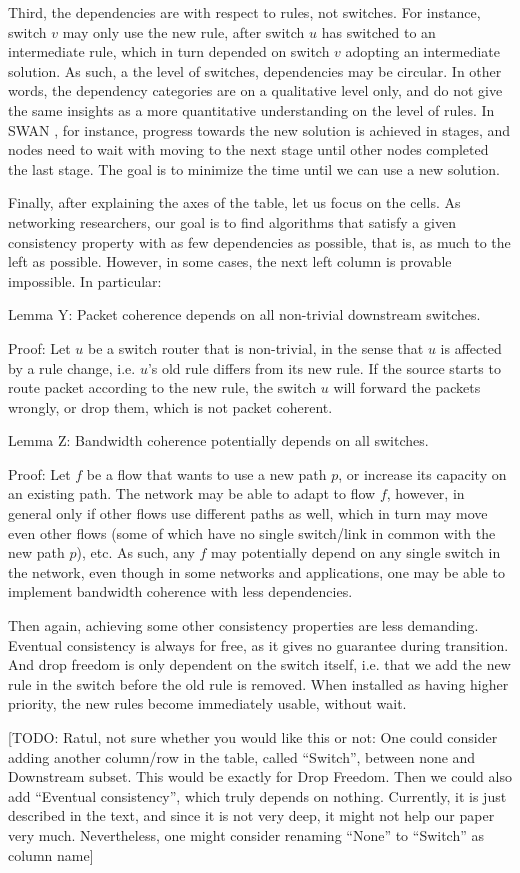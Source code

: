 Third, the dependencies are with respect to rules, not switches. For instance, switch $v$ may only use the new rule, after switch $u$ has switched to an intermediate rule, which in turn depended on switch $v$ adopting an intermediate solution. As such, a the level of switches, dependencies may be circular. In other words, the dependency categories are on a qualitative level only, and do not give the same insights as a more quantitative understanding on the level of rules. In SWAN \cite{swan}, for instance, progress towards the new solution is achieved in stages, and nodes need to wait with moving to the next stage until other nodes completed the last stage. The goal is to minimize the time until we can use a new solution.

Finally, after explaining the axes of the table, let us focus on the cells. As networking researchers, our goal is to find algorithms that satisfy a given consistency property with as few dependencies as possible, that is, as much to the left as possible. However, in some cases, the next left column is provable impossible. In particular:

Lemma Y: Packet coherence depends on all non-trivial downstream switches.

Proof: Let $u$ be a switch router that is non-trivial, in the sense that $u$ is affected by a rule change, i.e. $u$'s old rule differs from its new rule. If the source starts to route packet according to the new rule, the switch $u$ will forward the packets wrongly, or drop them, which is not packet coherent.

Lemma Z: Bandwidth coherence potentially depends on all switches.

Proof: Let $f$ be a flow that wants to use a new path $p$, or increase its capacity on an existing path. The network may be able to adapt to flow $f$, however, in general only if other flows use different paths as well, which in turn may move even other flows (some of which have no single switch/link in common with the new path $p$), etc. As such, any $f$ may potentially depend on any single switch in the network, even though in some networks and applications, one may be able to implement bandwidth coherence with less dependencies.

Then again, achieving some other consistency properties are less demanding. Eventual consistency is always for free, as it gives no guarantee during transition. And drop freedom is only dependent on the switch itself, i.e. that we add the new rule in the switch before the old rule is removed. When installed as having higher priority, the new rules become immediately usable, without wait.

[TODO: Ratul, not sure whether you would like this or not: One could consider adding another column/row in the table, called ``Switch'', between none and Downstream subset. This would be exactly for Drop Freedom. Then we could also add ``Eventual consistency'', which truly depends on nothing. Currently, it is just described in the text, and since it is not very deep, it might not help our paper very much. Nevertheless, one might consider renaming ``None'' to ``Switch'' as column name]


